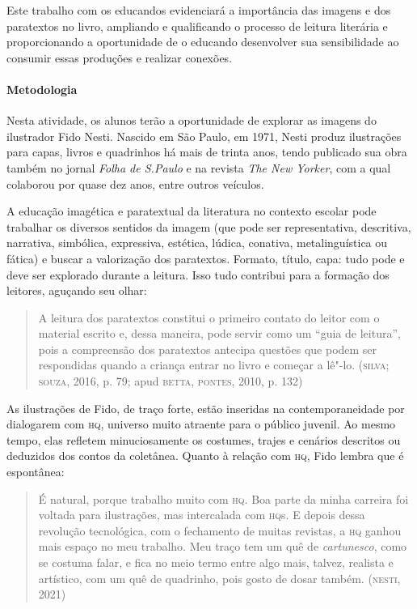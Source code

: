 \documentclass[11pt]{extarticle}
\begin{document}
Este trabalho com os educandos evidenciará a importância das imagens e
dos paratextos no livro, ampliando e qualificando o processo de leitura
literária e proporcionando a oportunidade de o educando desenvolver sua
sensibilidade ao consumir essas produções e realizar conexões.

\paragraph{Metodologia}
Nesta atividade, os alunos terão a oportunidade de explorar as imagens
do ilustrador Fido Nesti. Nascido em São Paulo, em 1971, Nesti produz
ilustrações para capas, livros e quadrinhos há mais de trinta anos,
tendo publicado sua obra também no jornal \emph{Folha de S.Paulo} e na
revista \emph{The New Yorker}, com a qual colaborou por quase dez anos,
entre outros veículos.

A educação imagética e paratextual da literatura no contexto escolar
pode trabalhar os diversos sentidos da imagem (que pode ser
representativa, descritiva, narrativa, simbólica, expressiva, estética,
lúdica, conativa, metalinguística ou fática) e buscar a valorização dos
paratextos. Formato, título, capa: tudo pode e deve ser explorado
durante a leitura. Isso tudo contribui para a formação dos leitores,
aguçando seu olhar:

\begin{quote}
A leitura dos paratextos constitui o primeiro contato do leitor com o
material escrito e, dessa maneira, pode servir como um ``guia de
leitura'', pois a compreensão dos paratextos antecipa questões que podem
ser respondidas quando a criança entrar no livro e começar a lê"-lo.
(\textsc{silva}; \textsc{souza}, 2016, p. 79; apud \textsc{betta}, \textsc{pontes}, 2010, p. 132)
\end{quote}

As ilustrações de Fido, de traço forte, estão inseridas na
contemporaneidade por dialogarem com \textsc{hq}, universo muito atraente para o
público juvenil. Ao mesmo tempo, elas refletem minuciosamente os
costumes, trajes e cenários descritos ou deduzidos dos contos da
coletânea. Quanto à relação com \textsc{hq}, Fido lembra que é espontânea:

\begin{quote}
É natural, porque trabalho muito com \textsc{hq}. Boa parte da minha carreira foi
voltada para ilustrações, mas intercalada com \textsc{hq}s. E depois dessa
revolução tecnológica, com o fechamento de muitas revistas, a \textsc{hq} ganhou
mais espaço no meu trabalho. Meu traço tem um quê de \emph{cartunesco},
como se costuma falar, e fica no meio termo entre algo mais, talvez,
realista e artístico, com um quê de quadrinho, pois gosto de dosar
também. (\textsc{nesti}, 2021)
\end{quote}
\end{document}
